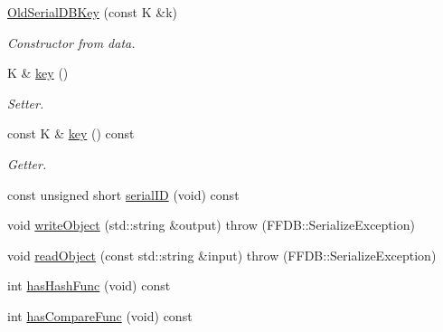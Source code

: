 \begin{DoxyCompactItemize}
\mbox{\hyperlink{classADATIO_1_1OldSerialDBKey_a3b075f5aaa5e0d5e29f5a5dcfe51d575}{Old\+Serial\+D\+B\+Key}} (const K \&k)
\begin{DoxyCompactList}\small\item\em Constructor from data. \end{DoxyCompactList}\item 
K \& \mbox{\hyperlink{classADATIO_1_1OldSerialDBKey_ab191c26e658125d7ac4378c8b74d6f1b}{key}} ()
\begin{DoxyCompactList}\small\item\em Setter. \end{DoxyCompactList}\item 
const K \& \mbox{\hyperlink{classADATIO_1_1OldSerialDBKey_a10d8c5351439c43bacb5e365750e7b1d}{key}} () const
\begin{DoxyCompactList}\small\item\em Getter. \end{DoxyCompactList}\item 
const unsigned short \mbox{\hyperlink{classADATIO_1_1OldSerialDBKey_af45528e61ba59f1978d3492534dffd46}{serial\+ID}} (void) const
\item 
void \mbox{\hyperlink{classADATIO_1_1OldSerialDBKey_a4cc6346697a7bda74b9e14672cf21912}{write\+Object}} (std\+::string \&output)  throw (\+F\+F\+D\+B\+::\+Serialize\+Exception)
\item 
void \mbox{\hyperlink{classADATIO_1_1OldSerialDBKey_a4d79b5e8834dc154ddc981e153924ccd}{read\+Object}} (const std\+::string \&input)  throw (\+F\+F\+D\+B\+::\+Serialize\+Exception)
\item 
int \mbox{\hyperlink{classADATIO_1_1OldSerialDBKey_a5cf79bb34ed0e1a471eba03efe9988ad}{has\+Hash\+Func}} (void) const
\item 
int \mbox{\hyperlink{classADATIO_1_1OldSerialDBKey_a121b9e6811e4c16c9b05521b923b8dc7}{has\+Compare\+Func}} (void) const
\end{DoxyCompactItemize}
